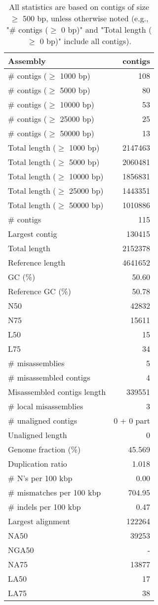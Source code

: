 \documentclass[12pt,a4paper]{article}
\begin{document}
\begin{table}[ht]
\begin{center}
\caption{All statistics are based on contigs of size $\geq$ 500 bp, unless otherwise noted (e.g., "\# contigs ($\geq$ 0 bp)" and "Total length ($\geq$ 0 bp)" include all contigs).}
\begin{tabular}{|l*{1}{|r}|}
\hline
Assembly & contigs \\ \hline
\# contigs ($\geq$ 1000 bp) & 108 \\ \hline
\# contigs ($\geq$ 5000 bp) & 80 \\ \hline
\# contigs ($\geq$ 10000 bp) & 53 \\ \hline
\# contigs ($\geq$ 25000 bp) & 25 \\ \hline
\# contigs ($\geq$ 50000 bp) & 13 \\ \hline
Total length ($\geq$ 1000 bp) & 2147463 \\ \hline
Total length ($\geq$ 5000 bp) & 2060481 \\ \hline
Total length ($\geq$ 10000 bp) & 1856831 \\ \hline
Total length ($\geq$ 25000 bp) & 1443351 \\ \hline
Total length ($\geq$ 50000 bp) & 1010886 \\ \hline
\# contigs & 115 \\ \hline
Largest contig & 130415 \\ \hline
Total length & 2152378 \\ \hline
Reference length & 4641652 \\ \hline
GC (\%) & 50.60 \\ \hline
Reference GC (\%) & 50.78 \\ \hline
N50 & 42832 \\ \hline
N75 & 15611 \\ \hline
L50 & 15 \\ \hline
L75 & 34 \\ \hline
\# misassemblies & 5 \\ \hline
\# misassembled contigs & 4 \\ \hline
Misassembled contigs length & 339551 \\ \hline
\# local misassemblies & 3 \\ \hline
\# unaligned contigs & 0 + 0 part \\ \hline
Unaligned length & 0 \\ \hline
Genome fraction (\%) & 45.569 \\ \hline
Duplication ratio & 1.018 \\ \hline
\# N's per 100 kbp & 0.00 \\ \hline
\# mismatches per 100 kbp & 704.95 \\ \hline
\# indels per 100 kbp & 0.47 \\ \hline
Largest alignment & 122264 \\ \hline
NA50 & 39253 \\ \hline
NGA50 & - \\ \hline
NA75 & 13877 \\ \hline
LA50 & 17 \\ \hline
LA75 & 38 \\ \hline
\end{tabular}
\end{center}
\end{table}
\end{document}
